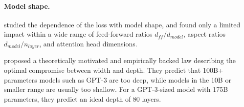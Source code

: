 



\paragraph{Model shape.} 
\citet{kaplan2020scaling} studied the dependence of the loss with model shape, and found only a limited impact within a wide range of feed-forward ratios $d_{ff} / d_{model}$, aspect ratios $d_{model}/n_{layer}$, and attention head dimensions. 

\citet{levine2020limits} proposed a theoretically motivated and empirically backed law describing the optimal compromise between width and depth. They predict that 100B+ parameters models such as GPT-3 are too deep, while models in the 10B or smaller range are usually too shallow. For a GPT-3-sized model with 175B parameters, they predict an ideal depth of 80 layers. 

